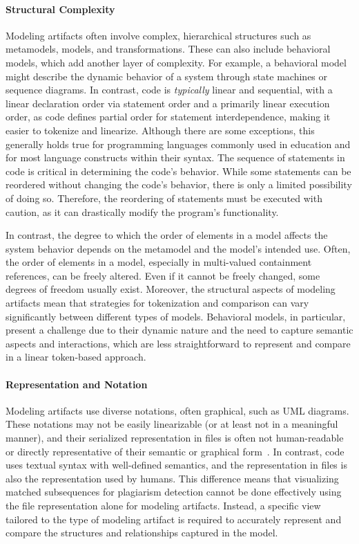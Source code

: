 \paragraph{Structural Complexity}
Modeling artifacts often involve complex, hierarchical structures such as metamodels, models, and transformations. These can also include behavioral models, which add another layer of complexity. For example, a behavioral model might describe the dynamic behavior of a system through state machines or sequence diagrams. In contrast, code is \textit{typically} linear and sequential, with a linear declaration order via statement order and a primarily linear execution order, as code defines partial order for statement interdependence, making it easier to tokenize and linearize. Although there are some exceptions, this generally holds true for programming languages commonly used in education and for most language constructs within their syntax.
The sequence of statements in code is critical in determining the code's behavior. While some statements can be reordered without changing the code's behavior, there is only a limited possibility of doing so.
Therefore, the reordering of statements must be executed with caution, as it can drastically modify the program's functionality.

In contrast, the degree to which the order of elements in a model affects the system behavior depends on the metamodel and the model's intended use. Often, the order of elements in a model, especially in multi-valued containment references, can be freely altered. Even if it cannot be freely changed, some degrees of freedom usually exist.
Moreover, the structural aspects of modeling artifacts mean that strategies for tokenization and comparison can vary significantly between different types of models. Behavioral models, in particular, present a challenge due to their dynamic nature and the need to capture semantic aspects and interactions, which are less straightforward to represent and compare in a linear token-based approach.

\paragraph{Representation and Notation}
Modeling artifacts use diverse notations, often graphical, such as \ac{UML} diagrams. These notations may not be easily linearizable (or at least not in a meaningful manner), and their serialized representation in files is often not human-readable or directly representative of their semantic or graphical form~\cite{Harel2004}. In contrast, code uses textual syntax with well-defined semantics, and the representation in files is also the representation used by humans. This difference means that visualizing matched subsequences for plagiarism detection cannot be done effectively using the file representation alone for modeling artifacts. Instead, a specific view tailored to the type of modeling artifact is required to accurately represent and compare the structures and relationships captured in the model.

